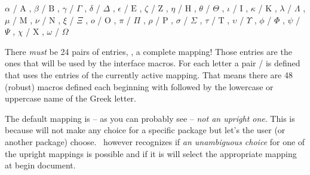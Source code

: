 \documentclass[load-preamble+,scrartcl={listof=totoc}]{cnltx-doc}
\begin{document}
\begin{sourcecode}
    {
      \ensuremath{\alpha}   / \ensuremath{\mathrm{A}} , %
      \ensuremath{\beta}    / \ensuremath{\mathrm{B}} , %
      \ensuremath{\gamma}   / \ensuremath{\Gamma} ,     %
      \ensuremath{\delta}   / \ensuremath{\Delta} ,     %
      \ensuremath{\epsilon} / \ensuremath{\mathrm{E}} , %
      \ensuremath{\zeta}    / \ensuremath{\mathrm{Z}} , %
      \ensuremath{\eta}     / \ensuremath{\mathrm{H}} , %
      \ensuremath{\theta}   / \ensuremath{\Theta} ,     %
      \ensuremath{\iota}    / \ensuremath{\mathrm{I}} , %
      \ensuremath{\kappa}   / \ensuremath{\mathrm{K}} , %
      \ensuremath{\lambda}  / \ensuremath{\Lambda} ,    %
      \ensuremath{\mu}      / \ensuremath{\mathrm{M}} , %
      \ensuremath{\nu}      / \ensuremath{\mathrm{N}} , %
      \ensuremath{\xi}      / \ensuremath{\Xi} ,        %
      \ensuremath{o}        / \ensuremath{\mathrm{O}} , %
      \ensuremath{\pi}      / \ensuremath{\Pi} ,        %
      \ensuremath{\rho}     / \ensuremath{\mathrm{P}} , %
      \ensuremath{\sigma}   / \ensuremath{\Sigma} ,     %
      \ensuremath{\tau}     / \ensuremath{\mathrm{T}} , %
      \ensuremath{\upsilon} / \ensuremath{\Upsilon} ,   %
      \ensuremath{\phi}     / \ensuremath{\Phi} ,       %
      \ensuremath{\psi}     / \ensuremath{\Psi} ,       %
      \ensuremath{\chi}     / \ensuremath{\mathrm{X}} , %
      \ensuremath{\omega}   / \ensuremath{\Omega}       %
  }
\end{sourcecode}

There \emph{must} be 24 pairs of entries, \ie, a complete mapping!  Those
entries are the ones that will be used by the interface macros.  For each
letter a pair / is defined that uses the entries
of the currently active mapping.  That means there are 48 (robust) macros
defined each beginning with  followed by the lowercase or
uppercase name of the Greek letter.

The default mapping is -- as you can probably see -- \emph{not an upright
  one}.  This is because \chemgreek{} will not make any choice for a specific
package but let's the user (or another package) choose.  \chemgreek\ however
recognizes if \emph{an unambiguous choice} for one of the upright mappings is
possible and if it is will select the appropriate mapping at begin document.
\end{document}
